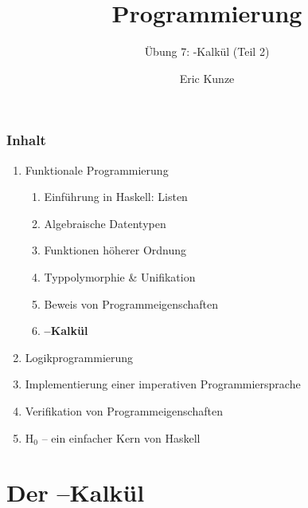 \documentclass{beamer}
\begin{document}
	
	\title{Programmierung}
	\subtitle{Übung 7: \textlambda-Kalkül (Teil 2)}
	\author{Eric Kunze}
	\date{}
	
	\maketitle
	


\begin{frame}[fragile] \frametitle{Inhalt}
	\begin{enumerate}
		\item Funktionale Programmierung
		\begin{enumerate}
			\item Einführung in Haskell: Listen
			\item Algebraische Datentypen
			\item Funktionen höherer Ordnung
			\item Typpolymorphie \& Unifikation
			\item Beweis von Programmeigenschaften
			\item \textbf{\textlambda--Kalkül}
		\end{enumerate}
		\item Logikprogrammierung
		\item Implementierung einer imperativen Programmiersprache
		\item Verifikation von Programmeigenschaften
		\item H${}_\text{0}$ -- ein einfacher Kern von Haskell
	\end{enumerate}
\end{frame}


\section{Der \textlambda--Kalkül}
\end{document}
